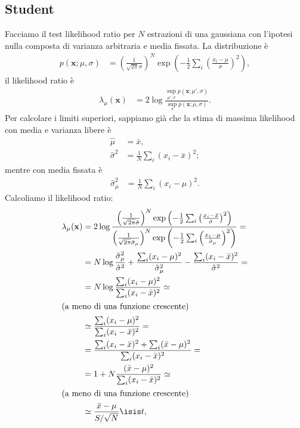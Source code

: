 
\subsection{Student}

Facciamo il test likelihood ratio per $N$ estrazioni di una gaussiana
con l'ipotesi nulla composta di varianza arbitraria e media fissata.
La distribuzione è
\begin{align*}
	p(\mathbf x;\mu,\sigma)
	&= \left(\frac1{\sqrt{2\pi}\sigma}\right)^N
	\exp \left( -\frac12 \sum_i \left(\frac{x_i-\mu}{\sigma}\right)^2 \right),
\end{align*}
il likelihood ratio è
\begin{align*}
	\lambda_\mu(\mathbf x)
	&= 2\log \frac
	{\sup\limits_{\mu',\sigma} p(\mathbf x;\mu',\sigma)}
	{\sup\limits_{\sigma} p(\mathbf x;\mu,\sigma)}.
\end{align*}
Per calcolare i limiti superiori,
sappiamo già che la stima di massima likelihood con media e varianza libere è
\begin{align*}
	\hat\mu
	&= \bar x, \\
	\hat\sigma^2
	&= \frac 1N \sum_i (x_i-\bar x)^2;
\end{align*}
mentre con media fissata è
\begin{align*}
	\hat\sigma_\mu^2
	&= \frac 1N \sum_i (x_i-\mu)^2.
\end{align*}
Calcoliamo il likelihood ratio:
\begin{align*}
	\lambda_\mu(\mathbf x)
	&= 2\log \frac
	{\left(\frac1{\sqrt{2\pi}\hat\sigma}\right)^N
	\exp \left( -\frac12 \sum_i \left(\frac{x_i-\bar x}{\hat\sigma}\right)^2 \right)}
	{\left(\frac1{\sqrt{2\pi}\hat\sigma_\mu}\right)^N
	\exp \left( -\frac12 \sum_i \left(\frac{x_i-\mu}{\hat\sigma_\mu}\right)^2 \right)} = \\
	&= N \log \frac{\hat\sigma_\mu^2}{\hat\sigma^2}
	+ \frac{\sum_i (x_i-\mu)^2}{\hat\sigma_\mu^2}
	- \frac{\sum_i (x_i-\bar x)^2}{\hat\sigma^2} = \\
	&= N \log \frac
	{\sum_i (x_i - \mu)^2}
	{\sum_i (x_i - \bar x)^2} \simeq \\
	\intertext{(a meno di una funzione crescente)}
	&\simeq \frac
	{\sum_i (x_i - \mu)^2}
	{\sum_i (x_i - \bar x)^2} = \\
	&= \frac
	{\sum_i (x_i - \bar x)^2 + \sum_i (\bar x-\mu)^2}
	{\sum_i (x_i - \bar x)^2} = \\
	&= 1 + N \frac {(\bar x-\mu)^2} {\sum_i (x_i-\bar x)^2} \simeq \\
	\intertext{(a meno di una funzione crescente)}
	&\simeq \frac{\bar x - \mu}{S/\sqrt N} \isis t,
\end{align*}
